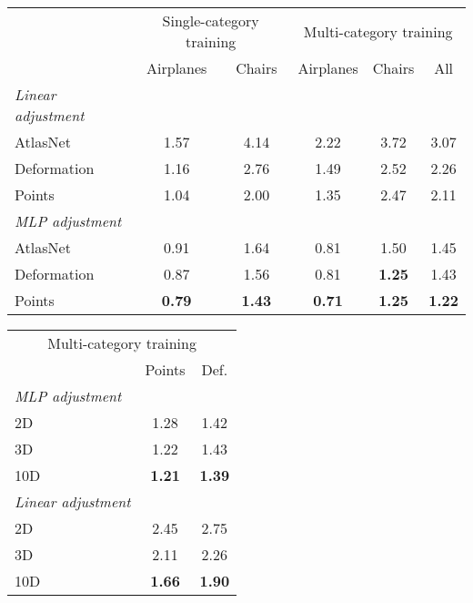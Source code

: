 \documentclass{article}
\begin{document}
\begin{table}[t]
\footnotesize
\begin{center}
\begin{adjustbox}{max width=0.6\textwidth}
\begin{tabular}{lcc|ccc}
     & \multicolumn{2}{c|}{  Single-category training  } & \multicolumn{3}{c}{  Multi-category training  } \\
     & Airplanes & Chairs & Airplanes & Chairs & All \\
    \hline
    \textit{Linear adjustment} & & & & & \\
      AtlasNet~\cite{groueix2018} & 1.57 & 4.14 & 2.22 & 3.72 & 3.07\\
    Deformation    & 1.16& 2.76 & 1.49 & 2.52 & 2.26\\
    Points          & 1.04 & 2.00  & 1.35 & 2.47 & 2.11\\
     \hline
    \textit{MLP adjustment} & & & & & \\
      AtlasNet~\cite{groueix2018} & 0.91 & 1.64 & 0.81 & 1.50 & 1.45\\
     Deformation   & 0.87  & 1.56  & 0.81 & {\bf 1.25} & 1.43\\
     Points          & {\bf 0.79}  & {\bf 1.43}  & {\bf 0.71} & {\bf 1.25} & {\bf 1.22}\\
\end{tabular}
\end{adjustbox}
\quad
\begin{adjustbox}{max width=0.30\textwidth}
\begin{tabular}{lcc}
\multicolumn{3}{c}{ Multi-category training }\\
         & Points & Def.\\
        \hline
\multicolumn{3}{l}{\textit{MLP adjustment}}\\
         2D        & 1.28  & 1.42 \\
         3D        & 1.22 & 1.43  \\
         10D       & \textbf{1.21}   & \textbf{1.39} \\
         {\textit{Linear adjustment}}\\
         2D        & 2.45 & 2.75 \\
         3D        & 2.11 & 2.26  \\
         10D       & \textbf{1.66}   &  \textbf{1.90}  \\
\end{tabular}
\end{adjustbox}


\end{center}
\end{table}
\end{document}
